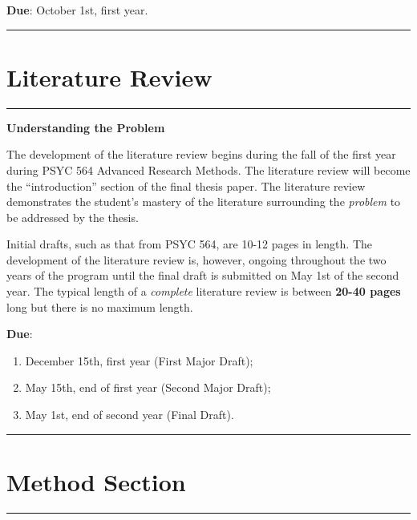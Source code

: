 \documentclass[openany]{book}
\providecommand{\tightlist}{%
  \setlength{\itemsep}{0pt}\setlength{\parskip}{0pt}}
\begin{document}
\textbf{Due}: October 1st, first year.

\begin{center}\rule{0.5\linewidth}{0.5pt}\end{center}

\hypertarget{literature-review}{%
\section{Literature Review}\label{literature-review}}

\begin{center}\rule{0.5\linewidth}{0.5pt}\end{center}

\textbf{Understanding the Problem}

The development of the literature review begins during the fall of the first year during PSYC 564 Advanced Research Methods. The literature review will become the ``introduction'' section of the final thesis paper. The literature review demonstrates the student's mastery of the literature surrounding the \emph{problem} to be addressed by the thesis.

Initial drafts, such as that from PSYC 564, are 10-12 pages in length. The development of the literature review is, however, ongoing throughout the two years of the program until the final draft is submitted on May 1st of the second year. The typical length of a \emph{complete} literature review is between \textbf{20-40 pages} long but there is no maximum length.

\textbf{Due}:

\begin{enumerate}
\def\labelenumi{\arabic{enumi}.}
\tightlist
\item
  December 15th, first year (First Major Draft);
\item
  May 15th, end of first year (Second Major Draft);
\item
  May 1st, end of second year (Final Draft).
\end{enumerate}

\begin{center}\rule{0.5\linewidth}{0.5pt}\end{center}

\hypertarget{method-section}{%
\section{Method Section}\label{method-section}}

\begin{center}\rule{0.5\linewidth}{0.5pt}\end{center}
\end{document}
